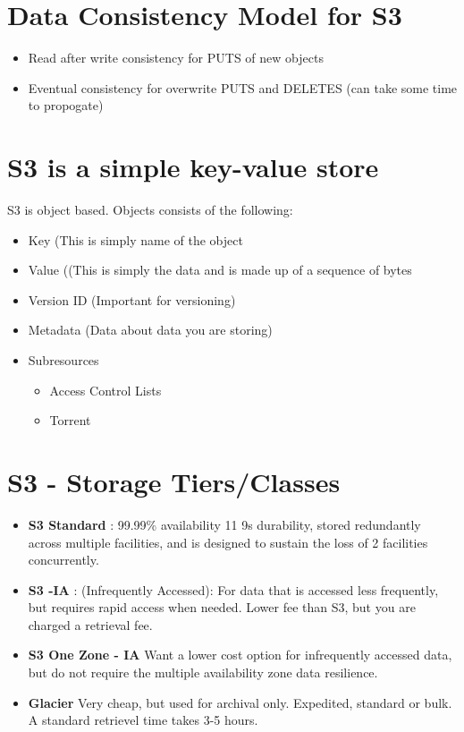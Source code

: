 \documentclass{report}
\begin{document}
\section*{Data Consistency Model for S3}
\begin{itemize}
\item
Read after write consistency for PUTS of new objects

\item
Eventual consistency for overwrite PUTS and DELETES (can take some time to propogate)
\end{itemize}

\section*{S3 is a simple key-value store}
S3 is object based. Objects consists of the following:
\begin{itemize}
\item
Key (This is simply name of the object
\item
Value ((This is simply the data and is made up of a sequence of bytes
\item
Version ID (Important for versioning)
\item
Metadata (Data about data you are storing)
\item
Subresources
	\begin{itemize}
	\item
	Access Control Lists
	
	\item
	Torrent
	
	\end{itemize}
\end{itemize}

\section*{S3 - Storage Tiers/Classes}
\begin{itemize}
\item
\textbf{S3 Standard} : 99.99\% availability 11 9s durability, stored redundantly across multiple facilities, and is designed to sustain the loss of 2 facilities concurrently.

\item
\textbf{S3 -IA} : (Infrequently Accessed): For data that is accessed less frequently, but requires rapid access when needed. Lower fee than S3, but you are charged a retrieval fee.

\item
\textbf{S3 One Zone - IA} Want a lower cost option for infrequently accessed data, but do not require the multiple availability zone data resilience.

\item
\textbf{Glacier} Very cheap, but used for archival only. Expedited, standard or bulk. A standard retrievel time takes 3-5 hours.
\end{itemize}
\end{document}
